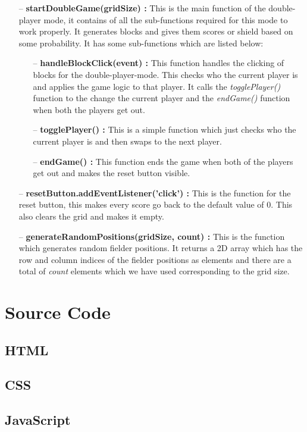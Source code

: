 \documentclass{article}
\begin{document}
\begin{itemize}
    \item[--] \textbf{startDoubleGame(gridSize) : }This is the main function of the double-player mode, it contains of all the sub-functions required for this mode to work properly. It generates blocks and gives them scores or shield based on some probability. It has some sub-functions which are listed below:
    \begin{itemize}
        \item[--] \textbf{handleBlockClick(event) : }This function handles the clicking of blocks for the double-player-mode. This checks who the current player is and applies the game logic to that player. It calls the \emph{togglePlayer()} function to the change the current player and the \emph{endGame()} function when both the players get out.
        \item[--] \textbf{togglePlayer() : }This is a simple function which just checks who the current player is and then swaps to the next player.
        \item[--] \textbf{endGame() : }This function ends the game when both of the players get out and makes the reset button visible.
    \end{itemize}
    \item[--] \textbf{resetButton.addEventListener('click') : }This is the function for the reset button, this makes every score go back to the default value of 0. This also clears the grid and makes it empty.
    \item[--] \textbf{generateRandomPositions(gridSize, count) : }This is the function which generates random fielder positions. It returns a 2D array which has the row and column indices of the fielder positions as elements and there are a total of \emph{count} elements which we have used corresponding to the grid size.
\end{itemize}
\clearpage
\section{Source Code}
\subsection{HTML}

\subsection{CSS}

\subsection{JavaScript}

\printbibliography
\end{document}
